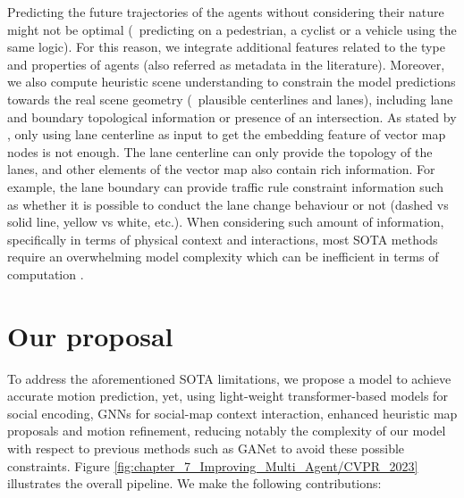 Predicting the future trajectories of the agents without considering their nature might not be optimal (\eg \ predicting on a pedestrian, a cyclist or a vehicle using the same logic). For this reason, we integrate additional features related to the type and properties of agents (also referred as metadata in the literature). Moreover, we also compute heuristic scene understanding to constrain the model predictions towards the real scene geometry (\eg \ plausible centerlines and lanes), including lane and boundary topological information or presence of an intersection. 
As stated by \cite{zhang2022banet}, only using lane centerline as input to get the embedding feature of vector map nodes is not enough. The lane centerline can only provide the
topology of the lanes, and other elements of the vector map also contain rich information. For example, the lane boundary can provide traffic rule constraint information such as whether it is possible to conduct the lane change behaviour or not (dashed vs solid line, yellow vs white, etc.). When considering such amount of information, specifically in terms of physical context and interactions, most \ac{SOTA} methods require an overwhelming model complexity which can be inefficient in terms of computation \cite{gao2020vectornet, walters2020trajectory, can2022maps}.

\section{Our proposal}
\label{sec:7_our_proposal}

To address the aforementioned \ac{SOTA} limitations, we propose a model \cite{gomez2023improving} to achieve accurate motion prediction, yet, using light-weight transformer-based models for social encoding, \acp{GNN} for social-map context interaction, enhanced heuristic map proposals and motion refinement, reducing notably the complexity of our model with respect to previous methods such as GANet \cite{wang2022ganet} to avoid these possible constraints. Figure \ref{fig:chapter_7_Improving_Multi_Agent/CVPR_2023} illustrates the overall pipeline. We make the following contributions:

